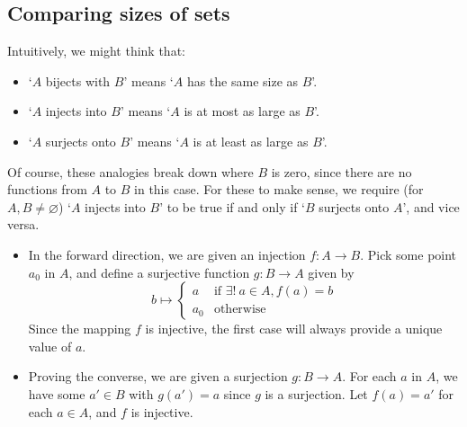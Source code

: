 \subsection{Comparing sizes of sets}
Intuitively, we might think that:
\begin{itemize}
	\item `\(A\) bijects with \(B\)' means `\(A\) has the same size as \(B\)'.
	\item `\(A\) injects into \(B\)' means `\(A\) is at most as large as \(B\)'.
	\item `\(A\) surjects onto \(B\)' means `\(A\) is at least as large as \(B\)'.
\end{itemize}
Of course, these analogies break down where \(B\) is zero, since there are no functions from \(A\) to \(B\) in this case.
For these to make sense, we require (for \(A, B\neq\varnothing\)) `\(A\) injects into \(B\)' to be true if and only if `\(B\) surjects onto \(A\)', and vice versa.
\begin{itemize}
	\item In the forward direction, we are given an injection \(f\colon A \to B\).
	      Pick some point \(a_0\) in \(A\), and define a surjective function \(g\colon B \to A\) given by
	      \[
		      b \mapsto \begin{cases}
			      a   & \text{if } \exists!\ a \in A, f(a) = b \\
			      a_0 & \text{otherwise}
		      \end{cases}
	      \]
	      Since the mapping \(f\) is injective, the first case will always provide a unique value of \(a\).
	\item Proving the converse, we are given a surjection \(g\colon B \to A\).
	      For each \(a\) in \(A\), we have some \(a' \in B\) with \(g(a') = a\) since \(g\) is a surjection.
	      Let \(f(a) = a'\) for each \(a\in A\), and \(f\) is injective.
\end{itemize}

